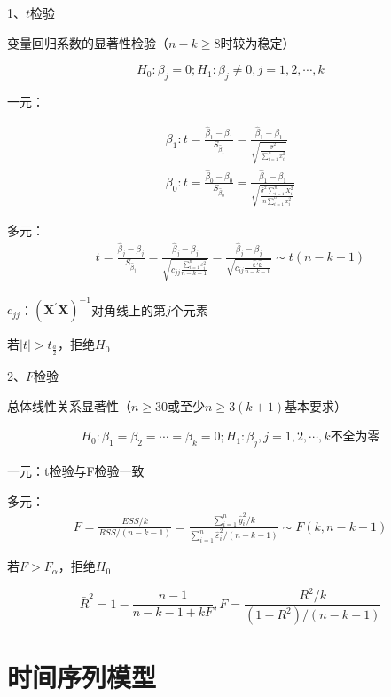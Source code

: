 \documentclass[12pt]{book}
\begin{document}
1、$t$检验

变量回归系数的显著性检验（$n-k\geq 8$时较为稳定）

$$
H_0:\beta_j=0; H_1:\beta_j\neq 0, j=1,2,\cdots,k
$$

一元：

\begin{gather*}
\beta_1:
t
=\frac{\hat{\beta}_1-\beta_1}{S_{\hat{\beta}_1}} 
=\frac{\hat{\beta}_1-\beta_1}{\sqrt{\frac{\hat{\sigma}^2}{\sum_{i=1}^{n}{x_i^2}}}}\\
\beta_0: 
t
=\frac{\hat{\beta}_0-\beta_0}{S_{\hat{\beta}_0}} 
=\frac{\hat{\beta}_1-\beta_1}{\sqrt{\frac{\hat{\sigma}^2\sum_{i=1}^{n}{X_i^2}}{n \sum_{i=1}^{n}{x_i^2}}}}
\end{gather*}


多元：
\begin{gather*}
    t=\frac{\hat{\beta}_j-\beta_j}{S_{\hat{\beta}_j}} =\frac{\hat{\beta}_j-\beta_j}{\sqrt{c_{jj}\frac{\sum_{i=1}^{n}{\varepsilon_i^2}}{n -k-1}}} =\frac{\hat{\beta}_j-\beta_j}{\sqrt{c_{ij}\frac{\bm{\hat{\varepsilon}}' \bm{ \hat{\varepsilon}}}{n -k-1}}} \sim t(n-k-1)
\end{gather*}


$c_{jj}$：$\left(\bm{X}^\prime\bm{X}\right)^{-1}$对角线上的第$j$个元素

若$\left|t\right|>t_{\frac{a}{2}}$，拒绝$H_0$

2、$F$检验

总体线性关系显著性（$n\geq 30$或至少$n\geq3\left(k+1\right)$基本要求）

\begin{gather*}
    H_0:\beta_1=\beta_2=\cdots=\beta_k=0;H_1:\beta_{j}, j=1,2,\cdots,k\text{不全为零}
\end{gather*}


一元：t检验与F检验一致

多元：
\begin{gather*}
F=\frac{ESS/k}{RSS/(n-k-1)} = \frac{\sum_{i=1}^{n}{\hat{y}_i^2/k}}{\sum_{i=1}^{n}{\hat{\varepsilon}_i^2/(n-k-1)}}\sim F(k,n-k-1)
\end{gather*}


若$F>F_\alpha$，拒绝$H_0$

$$
{\bar{R}}^2=1-\frac{n-1}{n-k-1+kF}, F=\frac{R^2/k}{(1-R^2)/(n-k-1)}
$$












\section{时间序列模型}
\end{document}
